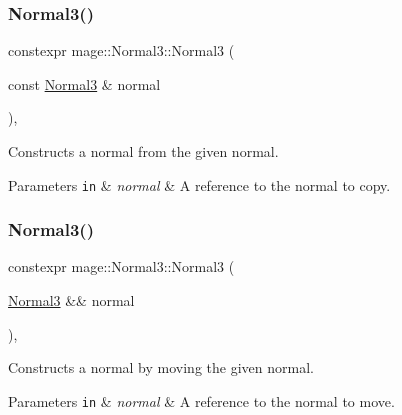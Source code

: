 \subsubsection{\texorpdfstring{Normal3()}{Normal3()}\hspace{0.1cm}{\footnotesize\ttfamily [3/5]}}
{\footnotesize\ttfamily constexpr mage\+::\+Normal3\+::\+Normal3 (\begin{DoxyParamCaption}\item[{const \mbox{\hyperlink{structmage_1_1_normal3}{Normal3}} \&}]{normal }\end{DoxyParamCaption})\hspace{0.3cm}{\ttfamily [default]}, {\ttfamily [noexcept]}}

Constructs a normal from the given normal.


\begin{DoxyParams}[1]{Parameters}
\mbox{\tt in}  & {\em normal} & A reference to the normal to copy. \\
\hline
\end{DoxyParams}
\mbox{\label{structmage_1_1_normal3_a2f0bf2d017db9e1e7e214d3a9a849764}} 
\subsubsection{\texorpdfstring{Normal3()}{Normal3()}\hspace{0.1cm}{\footnotesize\ttfamily [4/5]}}
{\footnotesize\ttfamily constexpr mage\+::\+Normal3\+::\+Normal3 (\begin{DoxyParamCaption}\item[{\mbox{\hyperlink{structmage_1_1_normal3}{Normal3}} \&\&}]{normal }\end{DoxyParamCaption})\hspace{0.3cm}{\ttfamily [default]}, {\ttfamily [noexcept]}}

Constructs a normal by moving the given normal.


\begin{DoxyParams}[1]{Parameters}
\mbox{\tt in}  & {\em normal} & A reference to the normal to move. \\
\hline
\end{DoxyParams}
\mbox{\label{structmage_1_1_normal3_aefed0af318bd76295b614153e75c3846}} 
